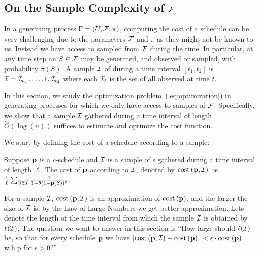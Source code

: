 


\subsection{On the Sample Complexity of $\F$}\label{sec:sampcomp}
In a generating process $\sys = (U, \F, \pi)$, computing the cost of a schedule can be very challenging due to the parameters $\F$ and $\pi$ as they might not be known to us.
Instead we have access to sampled {\ins} from $\F$ during the time. In particular, at any time step an {\ins} $S\in\F$ may be generated, and observed or sampled, with probability $\pi(S)$. A sample $\S$ of {\ins} during a time interval $[t_1, t_2]$ is $\S=\S_{t_1}\cup\ldots\cup\S_{t_2}$ where each $\S_t$ is the set of all observed {\ins} at time $t$.

In this section, we study the optimization problem~(\ref{eq:optimization}) in generating processes for which we only have access to samples of $\F$. Specifically, we show that a sample $\S$ gathered during a time interval of length $\tilde O(\log(n))$ suffices to estimate and optimize the cost function.


We start by defining the cost of a schedule according to a sample:
\begin{definition}
 Suppose $\p$ is a $c$-schedule and $\S$ is a sample of {\ins}s gathered during a time interval of length $\ell$. The cost of $\p$ according to $\S$, denoted by $\cost{\p,\S}$, is
 $\frac{1}{\ell}\sum_{S\in \S} \frac{1}{1-\theta(1-\p(S))^c}$.
\end{definition}
For a sample $\S$, $\cost{\p,\S}$ is an approximation of $\cost{\p}$, and the larger the size of $\S$ is, by the Law of Large Numbers we get better approximation. Lets denote the length of the time interval from which the sample $\S$ is obtained by $\ell(\S)$. The question we want to answer in this section is ``How large should $\ell(\S)$ be, so that for every schedule $\p$ we have $|\cost{\p,\S} - \cost{\p}| < \epsilon\cdot\cost{\p}$ w.h.p for $\epsilon > 0$?''

